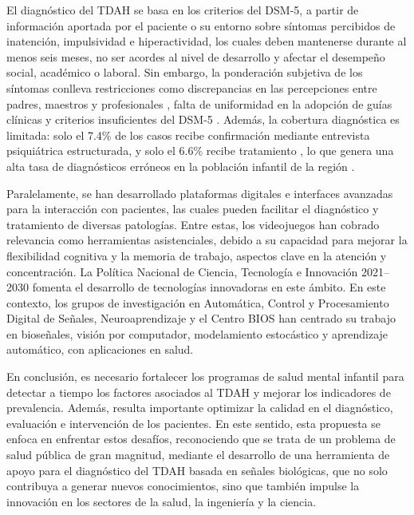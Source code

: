 El diagnóstico del TDAH se basa en los criterios del DSM-5, a partir de información aportada por el paciente o su entorno sobre síntomas percibidos de inatención, impulsividad e hiperactividad, los cuales deben mantenerse durante al menos seis meses, no ser acordes al nivel de desarrollo y afectar el desempeño social, académico o laboral. Sin embargo, la ponderación subjetiva de los síntomas conlleva restricciones como discrepancias en las percepciones entre padres, maestros y profesionales \cite{Narad2015}, falta de uniformidad en la adopción de guías clínicas y criterios insuficientes del DSM-5 \cite{Eslami2021,Yeh2012}. Además, la cobertura diagnóstica es limitada: solo el 7.4\% de los casos recibe confirmación mediante entrevista psiquiátrica estructurada, y solo el 6.6\% recibe tratamiento \cite{Polanczyk2014}, lo que genera una alta tasa de diagnósticos erróneos en la población infantil de la región \cite{DeLaViudaSuarez2021}.

Paralelamente, se han desarrollado plataformas digitales e interfaces avanzadas para la interacción con pacientes, las cuales pueden facilitar el diagnóstico y tratamiento de diversas patologías. Entre estas, los videojuegos han cobrado relevancia como herramientas asistenciales, debido a su capacidad para mejorar la flexibilidad cognitiva y la memoria de trabajo, aspectos clave en la atención y concentración. La Política Nacional de Ciencia, Tecnología e Innovación 2021–2030 fomenta el desarrollo de tecnologías innovadoras en este ámbito. En este contexto, los grupos de investigación en Automática, Control y Procesamiento Digital de Señales, Neuroaprendizaje y el Centro BIOS han centrado su trabajo en bioseñales, visión por computador, modelamiento estocástico y aprendizaje automático, con aplicaciones en salud.

En conclusión, es necesario fortalecer los programas de salud mental infantil para detectar a tiempo los factores asociados al TDAH y mejorar los indicadores de prevalencia. Además, resulta importante optimizar la calidad en el diagnóstico, evaluación e intervención de los pacientes. En este sentido, esta propuesta se enfoca en enfrentar estos desafíos, reconociendo que se trata de un problema de salud pública de gran magnitud, mediante el desarrollo de una herramienta de apoyo para el diagnóstico del TDAH basada en señales biológicas, que no solo contribuya a generar nuevos conocimientos, sino que también impulse la innovación en los sectores de la salud, la ingeniería y la ciencia.
